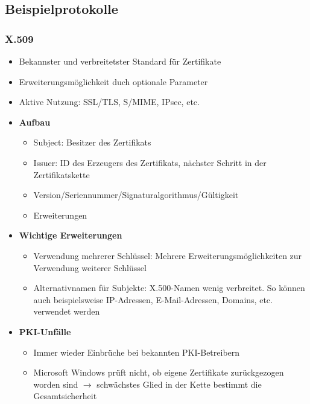 \subsection{Beispielprotokolle}

\subsubsection{X.509}
\begin{itemize}
	\item Bekannster und verbreitetster Standard für Zertifikate
	\item Erweiterungsmöglichkeit duch optionale Parameter
	\item Aktive Nutzung: SSL/TLS, S/MIME, IPsec, etc.
	\item \textbf{Aufbau}
	\begin{itemize}
		\item Subject: Besitzer des Zertifikats
		\item Issuer: ID des Erzeugers des Zertifikats, nächster Schritt in der Zertifikatskette
		\item Version/Seriennummer/Signaturalgorithmus/Gültigkeit
		\item Erweiterungen
	\end{itemize}
	\item \textbf{Wichtige Erweiterungen}
	\begin{itemize}
		\item Verwendung mehrerer Schlüssel: Mehrere Erweiterungsmöglichkeiten zur Verwendung weiterer Schlüssel
		\item Alternativnamen für Subjekte: X.500-Namen wenig verbreitet. So können auch beispielsweise IP-Adressen, E-Mail-Adressen, Domains, etc. verwendet werden
	\end{itemize}
	\item \textbf{PKI-Unfälle}
	\begin{itemize}
		\item Immer wieder Einbrüche bei bekannten PKI-Betreibern
		\item Microsoft Windows prüft nicht, ob eigene Zertifikate zurückgezogen worden sind \(\rightarrow\) schwächstes Glied in der Kette bestimmt die Gesamtsicherheit
	\end{itemize}
\end{itemize}

